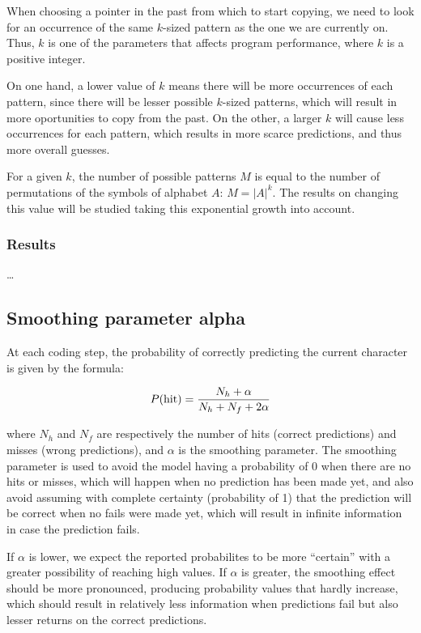 \documentclass{article}
\begin{document}
When choosing a pointer in the past from which to start copying, we need to look for an occurrence of the same $k$-sized pattern as the one we are currently on.
Thus, $k$ is one of the parameters that affects program performance, where $k$ is a positive integer.

On one hand, a lower value of $k$ means there will be more occurrences of each pattern, since there will be lesser possible $k$-sized patterns, which will result in more oportunities to copy from the past.
On the other, a larger $k$ will cause less occurrences for each pattern, which results in more scarce predictions, and thus more overall guesses.

For a given $k$, the number of possible patterns $M$ is equal to the number of permutations of the symbols of alphabet $A$: $M = \vert A \vert ^ k$.
The results on changing this value will be studied taking this exponential growth into account.

\subsubsection{Results}

\dots

\subsection{Smoothing parameter alpha}

At each coding step, the probability of correctly predicting the current character is given by the formula:

$$
P(\textnormal{hit}) = \frac{N_h + \alpha}{N_h + N_f + 2\alpha}
$$

where $N_h$ and $N_f$ are respectively the number of hits (correct predictions) and misses (wrong predictions), and $\alpha$ is the smoothing parameter.
The smoothing parameter is used to avoid the model having a probability of 0 when there are no hits or misses, which will happen when no prediction has been made yet, and also avoid assuming with complete certainty (probability of 1) that the prediction will be correct when no fails were made yet, which will result in infinite information in case the prediction fails.

If $\alpha$ is lower, we expect the reported probabilites to be more ``certain'' with a greater possibility of reaching high values.
If $\alpha$ is greater, the smoothing effect should be more pronounced, producing probability values that hardly increase, which should result in relatively less information when predictions fail but also lesser returns on the correct predictions.
\end{document}
